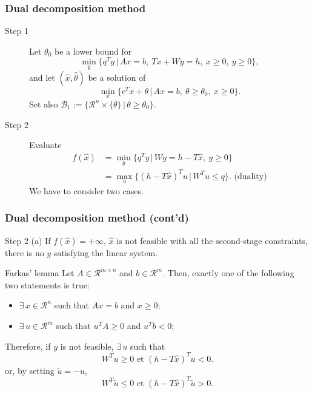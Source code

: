\documentclass{beamer}
\def\rit{\mathcal{R}}
\begin{document}
\begin{frame}
\frametitle{Dual decomposition method}

\begin{description}
\item[\red Step 1]
Let $\theta_0$ be a lower bound for
\[
\min_y \lbrace q^Ty \,|\, Ax = b,\ Tx+Wy = h,\ x \geq 0,\ y \geq 0 \rbrace,
\]
and let $(\hat{x}, \hat{\theta})$ be a solution of
\[
\min_x \lbrace c^Tx + \theta \,|\, Ax = b,\ \theta \geq \theta_0,\ x
\geq 0 \rbrace.
\]
Set also $\mathcal{B}_1 := \lbrace \rit^n \times \lbrace \theta \rbrace
\,|\, \theta \geq \theta_0 \rbrace$.
\item[\red Step 2]
Evaluate
\begin{align*}
f(\hat{x}) &= \min_y \lbrace q^Ty \,|\, Wy = h-T\hat{x},\ y \geq 0
\rbrace \\
&= \max_u \lbrace (h-T\hat{x})^Tu \,|\, W^Tu \leq q \rbrace. \mbox{ (duality)}
\end{align*}
We have to consider two cases.
\end{description}
\end{frame}

\begin{frame}
\frametitle{Dual decomposition method (cont'd)}

{\red Step 2 (a)}
If $f(\hat{x}) = +\infty$, $\hat{x}$ is not feasible with all the second-stage constraints, there is no $y$ satisfying the linear system.

\mbox{}

\begin{block}{Farkas' lemma}
Let $A \in \rit^{m \times n}$ and $b \in \rit^m$.
Then, exactly one of the following two statements is true:
\begin{itemize}
\item
$\exists\, x \in \rit^n$ such that $Ax = b$ and $x \geq 0$;
\item
$\exists\, u \in \rit^m$ such that $u^T A \geq 0$ and $u^T b < 0$;
\end{itemize}
\end{block}
	
\mbox{}

Therefore, if $y$ is not feasible, $\exists\, u$ such that
\[
W^Tu \geq 0 \mbox{ et } (h - T\hat{x})^T u < 0.
\]
or, by setting $\tilde{u} = -u$,
\[
W^T\tilde{u} \leq 0 \mbox{ et } (h - T\hat{x})^T \tilde{u} > 0.
\]

\end{frame}
\end{document}
